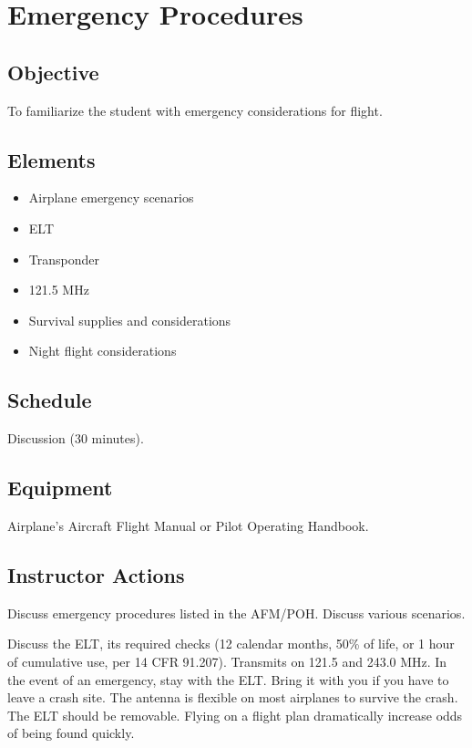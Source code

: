 \section{Emergency Procedures}

\subsection{Objective}

To familiarize the student with emergency considerations for flight.

\subsection{Elements}

\begin{itemize}
  \item Airplane emergency scenarios
  \item ELT
  \item Transponder
  \item 121.5 MHz
  \item Survival supplies and considerations
  \item Night flight considerations
\end{itemize}

\subsection{Schedule}

Discussion (30 minutes).

\subsection{Equipment}

Airplane's Aircraft Flight Manual or Pilot Operating Handbook.

\subsection{Instructor Actions}

Discuss emergency procedures listed in the AFM/POH. Discuss various scenarios.

Discuss the ELT, its required checks (12 calendar months, 50\% of life, or 1
hour of cumulative use, per 14 CFR 91.207). Transmits on 121.5 and 243.0 MHz.
In the event of an emergency, stay with the ELT. Bring it with you if you have
to leave a crash site. The antenna is flexible on most airplanes to survive the
crash. The ELT should be removable. Flying on a flight plan dramatically
increase odds of being found quickly.

